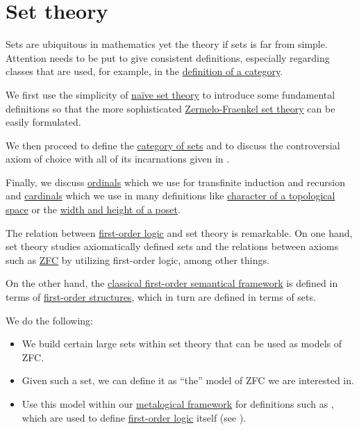 \section{Set theory}\label{sec:set_theory}

Sets are ubiquitous in mathematics yet the theory if sets is far from simple. Attention needs to be put to give consistent definitions, especially regarding classes that are used, for example, in the \hyperref[def:category]{definition of a category}.

We first use the simplicity of \hyperref[def:naive_set_theory]{na\"ive set theory} to introduce some fundamental definitions so that the more sophisticated \hyperref[def:zfc]{Zermelo-Fraenkel set theory} can be easily formulated.

We then proceed to define the \hyperref[src/category_of_sets]{category of sets} and to discuss the controversial axiom of choice with all of its incarnations given in .

Finally, we discuss \hyperref[src/ordinals]{ordinals} which we use for transfinite induction and recursion and \hyperref[src/cardinals]{cardinals} which we use in many definitions like \hyperref[def:topological_space_character]{character of a topological space} or the \hyperref[def:poset_chain_and_antichain]{width and height of a poset}.

\begin{remark}\label{rem:set_definition_recursion}
  The relation between \hyperref[first_order_logic]{first-order logic} and set theory is remarkable. On one hand, set theory studies axiomatically defined sets and the relations between axioms such as \hyperref[def:zfc]{ZFC} by utilizing first-order logic, among other things.

  On the other hand, the \hyperref[def:first_order_semantics]{classical first-order semantical framework} is defined in terms of \hyperref[def:first_order_structure]{first-order structures}, which in turn are defined in terms of sets.

  We do the following:
  \begin{itemize}
    \item We build certain large sets within set theory that can be used as models of ZFC.
    \item Given such a set, we can define it as \enquote{the} model of ZFC we are interested in.
    \item Use this model within our \hyperref[rem:metalogic]{metalogical framework} for definitions such as , which are used to define \hyperref[sec:first_order_logic]{first-order logic} itself (see ).
  \end{itemize}
\end{remark}

